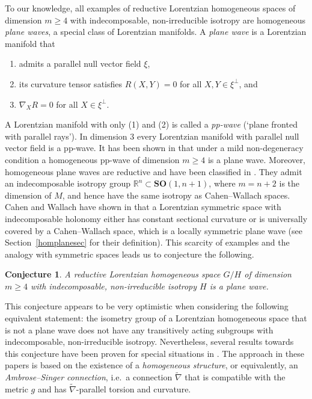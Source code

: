 \documentclass[11pt,a4paper]{amsart}
\newcommand{\tnab}{\widetilde{\nabla}}
\newcommand{\+}{\oplus}
\newcommand{\SO}{\mathbf{SO}}
\newcommand{\1}{\mathbf{1}}
\newcommand{\R}{\mathbb{R}} %
\newcommand{\<}{\langle}
\renewcommand{\>}{\rangle}
\theoremstyle{definition}
\theoremstyle{plain}
\newtheorem{conjecture}[definition]{Conjecture}
\numberwithin{equation}{section}
\begin{document}
To our knowledge, all  examples of reductive Lorentzian homogeneous spaces of dimension $m\ge 4$ with indecomposable, non-irreducible isotropy are  homogeneous {\em plane waves}, a special class of Lorentzian manifolds. A  {\em plane wave} is a Lorentzian manifold that 
\begin{enumerate}
\item admits a parallel null vector field $\xi$,   
\item  its curvature tensor  satisfies  $R(X,Y)=0$ for all $X,Y\in \xi^\perp$, and
\item
 $\nabla_XR=0$ for all $X\in \xi^\perp$.   
\end{enumerate}A Lorentzian manifold with only (1) and (2) is called a {\em pp-wave} (`plane fronted with parallel rays'). 
In dimension $3$ every Lorentzian manifold with parallel null vector field is a pp-wave. 
It has been shown in \cite{GlobkeLeistner16} that under a mild non-degeneracy condition a homogeneous pp-wave of dimension $m\ge 4$  is a plane wave. Moreover, homogeneous plane waves are reductive and have been classified in \cite{blau-oloughlin03}.  They admit an indecomposable isotropy group  $\R^n\subset \SO(1,n+1)$, where $m=n+2$ is the dimension of $M$,  and hence have the same isotropy as Cahen--Wallach spaces.  Cahen and Wallach have shown in  \cite{cahen-wallach70} that a Lorentzian symmetric space with indecomposable holonomy  either has constant sectional curvature or is universally covered by a Cahen--Wallach space, which is a locally symmetric plane wave (see Section~\ref{homplanesec} for their definition).
This scarcity of examples and the analogy with symmetric spaces leads us to conjecture the following.
\begin{conjecture}
\label{conj}
A reductive Lorentzian   homogeneous space $G/H$ of dimension $m\ge 4$  with indecomposable, non-irreducible isotropy $H$ is a plane wave.
\end{conjecture}
This conjecture appears to be very optimistic when considering the following equivalent statement: the isometry group of a Lorentzian homogeneous space that is not  a plane wave does not have any transitively acting subgroups with indecomposable, non-irreducible isotropy. Nevertheless, several results towards this conjecture have been proven for   special situations in  \cite{Meessen06,Montesinos-Amil01, ErnstGalaev22, ErnstGalaev23}. 
The approach in these papers is based on the existence of a {\em homogeneous structure}, or equivalently, an  {\em Ambrose--Singer connection}, i.e.~a  connection $\tnab$ that is compatible with the metric $g$ and has $\tnab$-parallel torsion and curvature.
\end{document}
